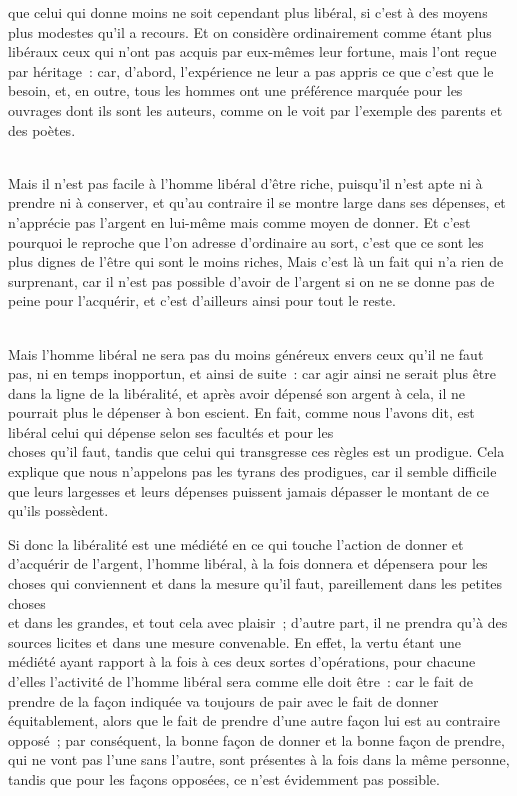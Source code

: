 \documentclass[french,twoside]{book} %
\begin{document}
que celui qui donne moins ne soit cependant plus libéral, si c’est à des moyens plus modestes qu’il a recours. Et on considère ordinairement comme étant plus libéraux ceux qui n’ont pas acquis par eux-mêmes leur fortune, mais l’ont reçue par héritage : car, d’abord, l’expérience ne leur a pas appris ce que c’est que le besoin, et, en outre, tous les hommes ont une préférence marquée pour les ouvrages dont ils sont les auteurs, comme on le voit par l’exemple des parents et des poètes.\par
\\
Mais il n’est pas facile à l’homme libéral d’être riche, puisqu’il n’est apte ni à prendre ni à conserver, et qu’au contraire il se montre large dans ses dépenses, et n’apprécie pas l’argent en lui-même mais comme moyen de donner. Et c’est pourquoi le reproche que l’on adresse d’ordinaire au sort, c’est que ce sont les plus dignes de l’être qui sont le moins riches, Mais c’est là un fait qui n’a rien de surprenant, car il n’est pas possible d’avoir de l’argent si on ne se donne pas de peine pour l’acquérir, et c’est d’ailleurs ainsi pour tout le reste.\par
\\
Mais l’homme libéral ne sera pas du moins généreux envers ceux qu’il ne faut pas, ni en temps inopportun, et ainsi de suite : car agir ainsi ne serait plus être dans la ligne de la libéralité, et après avoir dépensé son argent à cela, il ne pourrait plus le dépenser à bon escient. En fait, comme nous l’avons dit, est libéral celui qui dépense selon ses facultés et pour les \\
choses qu’il faut, tandis que celui qui transgresse ces règles est un prodigue. Cela explique que nous n’appelons pas les tyrans des prodigues, car il semble difficile que leurs largesses et leurs dépenses puissent jamais dépasser le montant de ce qu’ils possèdent.\par
Si donc la libéralité est une médiété en ce qui touche l’action de donner et d’acquérir de l’argent, l’homme libéral, à la fois donnera et dépensera pour les choses qui conviennent et dans la mesure qu’il faut, pareillement dans les petites choses \\
et dans les grandes, et tout cela avec plaisir ; d’autre part, il ne prendra qu’à des sources licites et dans une mesure convenable. En effet, la vertu étant une médiété ayant rapport à la fois à ces deux sortes d’opérations, pour chacune d’elles l’activité de l’homme libéral sera comme elle doit être : car le fait de prendre de la façon indiquée va toujours de pair avec le fait de donner équitablement, alors que le fait de prendre d’une autre façon lui est au contraire opposé ; par conséquent, la bonne façon de donner et la bonne façon de prendre, qui ne vont pas l’une sans l’autre, sont présentes à la fois dans la même personne, tandis que pour les façons opposées, ce n’est évidemment pas possible.\par
\end{document}

